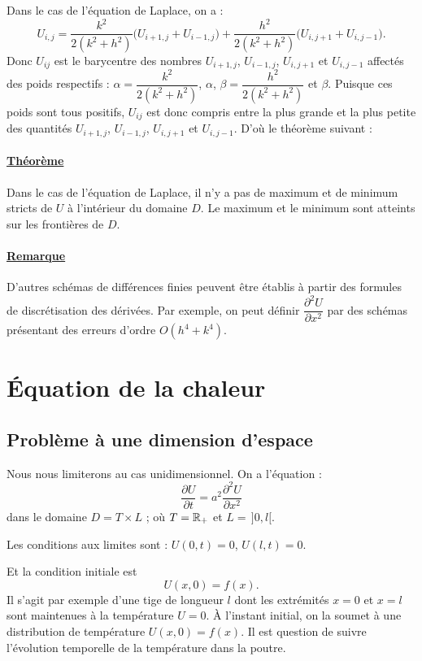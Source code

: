 Dans le cas de l'équation de Laplace, on a :
\[
  U_{i,j} = \frac{k^2}{2(k^2 + h^2)}\bigl(U_{i+1,j} + U_{i-1,j}\bigr)
          + \frac{h^2}{2(k^2 + h^2)}\bigl(U_{i,j+1} + U_{i,j-1}\bigr).
\]
Donc $U_{ij}$ est le barycentre des nombres $U_{i+1,j}$, $U_{i-1,j}$,
$U_{i,j+1}$ et $U_{i,j-1}$ affectés des poids respectifs :
$\alpha = \dfrac{k^2}{2(k^2 + h^2)}$, $\alpha$,
$\beta = \dfrac{h^2}{2(k^2 + h^2)}$ et $\beta$. Puisque ces poids sont tous
positifs, $U_{ij}$ est donc compris entre la plus grande et la plus petite des
quantités $U_{i+1,j}$, $U_{i-1,j}$, $U_{i,j+1}$ et $U_{i,j-1}$. D'où le
théorème suivant :

\paragraph{\underline{Théorème}} Dans le cas de l'équation de Laplace, il n'y
a pas de maximum et de minimum stricts de $U$ à l'intérieur du domaine $D$. Le
maximum et le minimum sont atteints sur les frontières de $D$.

\paragraph{\underline{Remarque}} D'autres schémas de différences finies
peuvent être établis à partir des formules de discrétisation des dérivées. Par
exemple, on peut définir $\dfrac{\partial^2 U}{\partial x^2}$ par des schémas
présentant des erreurs d'ordre $O(h^4 + k^4)$.

\section{Équation de la chaleur}

\subsection{Problème à une dimension d'espace}

Nous nous limiterons au cas unidimensionnel. On a l'équation :
\begin{equation}
  \frac{\partial U}{\partial t} = a^2\frac{\partial^2 U}{\partial x^2}
  \tag{C1}
\end{equation}
dans le domaine $D = T \times L$ ; où $T = \mathbb{R}_+$ et $L = \,]0, l[$.

Les conditions aux limites sont : $U(0, t) = 0$, $U(l, t) = 0$.

Et la condition initiale est
\[
  U(x, 0) = f(x) .
\]
Il s'agit par exemple d'une tige de longueur $l$ dont les extrémités $x = 0$
et $x = l$ sont maintenues à la température $U = 0$. À l'instant initial, on
la soumet à une distribution de température $U(x, 0) = f(x)$. Il est question
de suivre l'évolution temporelle de la température dans la poutre.

